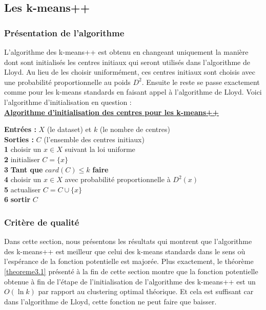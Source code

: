 \documentclass[12pt,a4paper]{book}
\newcommand{\1}{\mathds{1}}
\begin{document}

\subsection{Les k-means++}

\subsubsection{Présentation de l'algorithme}

L'algorithme des k-means++ est obtenu en changeant uniquement la manière dont sont initialisés les centres initiaux qui seront utilisés dans l'algorithme de Lloyd. Au lieu de les choisir uniformément, ces centres initiaux sont choisis avec une probabilité proportionnelle au poids $D^2$. Ensuite le reste se passe exactement comme pour les k-means standards en faisant appel à l'algorithme de Lloyd. Voici l'algorithme d'initialisation en question : \\

\noindent \textbf{\underline{Algorithme d'initialisation des centres pour les k-means++}}\label{algo_kmeans_pp}

\noindent \textbf{Entrées : } $X$ (le dataset) et $k$ (le nombre de centres)\\
\noindent \textbf{Sorties : } $C$ (l'ensemble des centres initiaux) \\
\textbf{1} choisir un $x \in X$ suivant la loi uniforme\\
\textbf{2} initialiser $C=\{x\}$\\
\textbf{3} \textbf{Tant que } $card(C) \leq k$ \textbf{faire}\\
\textbf{4} \indent choisir un $x \in X$ avec probabilité proportionnelle à $D^2(x)$\\
\textbf{5} \indent actualiser $C = C \cup \{x \}$\\
\textbf{6} \textbf{sortir} $C$ \\

\subsubsection{Critère de qualité}

Dans cette section, nous présentons les résultats qui montrent que l'algorithme des k-means++ est meilleur que celui des k-means standards dans le sens où l'espérance de la fonction potentielle est majorée. Plus exactement, le théorème \ref{theoreme3.1} présenté à la fin de cette section montre que la fonction potentielle obtenue à fin de l'étape de l'initialisation de l'algorithme des k-means++ est un $O(\ln k)$ par rapport au clustering optimal théorique. Et cela est suffisant car dans l'algorithme de Lloyd, cette fonction ne peut faire que baisser.
\end{document}
